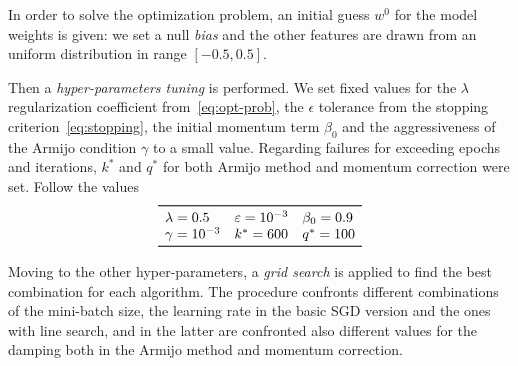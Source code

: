 In order to solve the optimization problem, an initial guess $w^0$ for the model weights is given: we set a null \emph{bias} and the other features are drawn from an uniform distribution in range $[-0.5,0.5]$.

Then a \emph{hyper-parameters tuning} is performed. We set fixed values for the $\lambda$ regularization coefficient from~\eqref{eq:opt-prob}, the $\epsilon$ tolerance from the stopping criterion~\eqref{eq:stopping}, the initial momentum term $\beta_0$ and the aggressiveness of the Armijo condition $\gamma$ to a small value. Regarding failures for exceeding epochs and iterations, $k^\ast$ and $q^\ast$ for both Armijo method and momentum correction were set. Follow the values
\[
\begin{array}{lll}
\toprule
\lambda=0.5 & \epsilon=\num{e-3} & \beta_0=0.9 \\
\gamma=\num{e-3} & k^\ast=600 & q^\ast=100 \\
\bottomrule
\end{array}
\]

Moving to the other hyper-parameters, a \emph{grid search} is applied to find the best combination for each algorithm. The procedure confronts different combinations of the mini-batch size, the learning rate in the basic SGD version and the ones with line search, and in the latter are confronted also different values for the damping both in the Armijo method and momentum correction.

